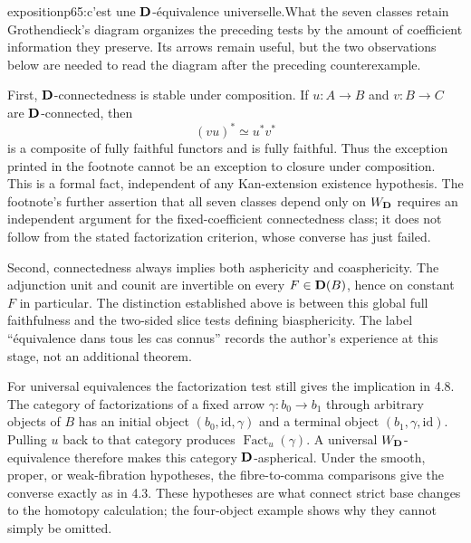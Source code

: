 \begin{dcomment}{exposition}{p65:c'est une $\mathbf{D}$-équivalence universelle.}{What the seven classes retain}
Grothendieck's diagram organizes the preceding tests by the amount of coefficient information they preserve. Its arrows remain useful, but the two observations below are needed to read the diagram after the preceding counterexample.

First, $\mathbf{D}$-connectedness is stable under composition. If $u:A\to B$ and $v:B\to C$ are $\mathbf{D}$-connected, then
\[
       (vu)^*\simeq u^*v^*
\]
is a composite of fully faithful functors and is fully faithful. Thus the exception printed in the footnote cannot be an exception to closure under composition. This is a formal fact, independent of any Kan-extension existence hypothesis. The footnote's further assertion that all seven classes depend only on $W_{\mathbf{D}}$ requires an independent argument for the fixed-coefficient connectedness class; it does not follow from the stated factorization criterion, whose converse has just failed.

Second, connectedness always implies both asphericity and coasphericity. The adjunction unit and counit are invertible on every $F\in\mathbf{D}(B)$, hence on constant $F$ in particular. The distinction established above is between this global full faithfulness and the two-sided slice tests defining biasphericity. The label ``équivalence dans tous les cas connus'' records the author's experience at this stage, not an additional theorem.

For universal equivalences the factorization test still gives the implication in 4.8. The category of factorizations of a fixed arrow $\gamma:b_0\to b_1$ through arbitrary objects of $B$ has an initial object $(b_0,\mathrm{id},\gamma)$ and a terminal object $(b_1,\gamma,\mathrm{id})$. Pulling $u$ back to that category produces $\operatorname{Fact}_u(\gamma)$. A universal $W_{\mathbf{D}}$-equivalence therefore makes this category $\mathbf{D}$-aspherical. Under the smooth, proper, or weak-fibration hypotheses, the fibre-to-comma comparisons give the converse exactly as in 4.3. These hypotheses are what connect strict base changes to the homotopy calculation; the four-object example shows why they cannot simply be omitted.
\end{dcomment}


